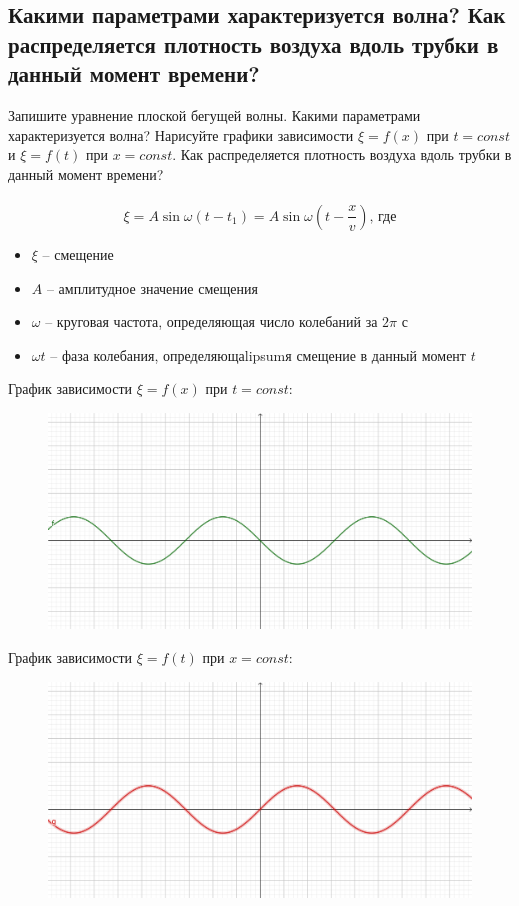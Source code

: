 \documentclass[otchet]{SCWorks}
\begin{document}
\subsection{Какими параметрами характеризуется волна? Как распределяется плотность воздуха вдоль трубки в данный момент времени?}
Запишите уравнение плоской бегущей волны. Какими параметрами характеризуется волна? Нарисуйте графики зависимости $\xi = f(x)$ при $t = const$ и $\xi = f(t)$ при $x = const$. Как распределяется плотность воздуха вдоль трубки в данный момент времени? \\
\\
\begin{equation*}
    \xi = A\sin{\omega(t-t_1)} = A\sin{\omega(t-\frac x v)}\text{, где}
\end{equation*}
\begin{itemize}
    \item $\xi$ -- смещение
    \item $A$ -- амплитудное значение смещения
    \item $\omega$ -- круговая частота, определяющая число колебаний за $2\pi$ с
    \item $\omega t$ -- фаза колебания, определяющаlipsumя смещение в данный момент $t$
\end{itemize}
\newpage
График зависимости $\xi = f(x)$ при $t = const$:
\begin{figure}[h!]
    \includegraphics[width=\textwidth]{240312_physics_13.1_1.png}
\end{figure}

График зависимости $\xi = f(t)$ при $x = const$:
\begin{figure}[h!]
    \includegraphics[width=\textwidth]{240312_physics_13.1_2.png}
\end{figure}
\end{document}
